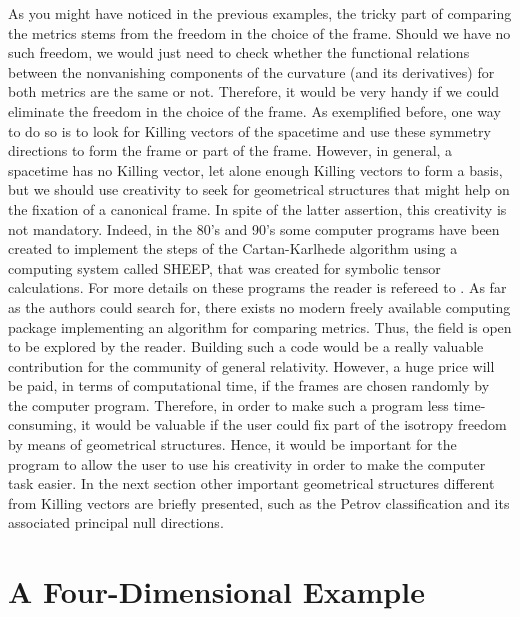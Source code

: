 \documentclass[twocolumn,prd,aps,showpacs,showkeys,amsmath,amssymb]{revtex4-1}
\begin{document}
As you might have noticed in the previous examples, the tricky part of comparing the metrics stems from the freedom in the choice of the frame. Should we have no such freedom, we would just need to check whether the functional relations between the nonvanishing components of the curvature (and its derivatives) for both metrics are the same or not. Therefore, it would be very handy if we could eliminate the freedom in the choice of the frame. As exemplified before, one way to do so is to look for Killing vectors of the spacetime and use these symmetry directions to form the frame or part of the frame. However, in general, a spacetime has no Killing vector, let alone enough Killing vectors to form a basis, but we should use creativity to seek for geometrical structures that might help on the fixation of a canonical frame. In spite of the latter assertion, this creativity is not mandatory. Indeed, in the 80's and 90's some computer programs have been created to implement the steps of the Cartan-Karlhede algorithm using a computing system called SHEEP, that was created for symbolic tensor calculations. For more details on these programs the reader is refereed to \cite{Aman1,Aman2,McCallum}. As far as the authors could search for, there exists no modern freely available computing package implementing an algorithm for comparing metrics. Thus, the field is open to be explored by the reader. Building such a code would be a really valuable contribution for the community of general relativity. However, a huge price will be paid, in terms of computational time, if the frames are chosen randomly by the computer program. Therefore, in order to make such a program less time-consuming, it would be valuable if the user could fix part of the isotropy freedom by means of geometrical structures. Hence, it would be important for the program to allow the user to use his creativity in order to make the computer task easier. In the next section other important geometrical structures different from Killing vectors are briefly presented, such as the Petrov classification and its associated principal null directions.






\section{A Four-Dimensional Example}\label{Appendix4}
\end{document}
